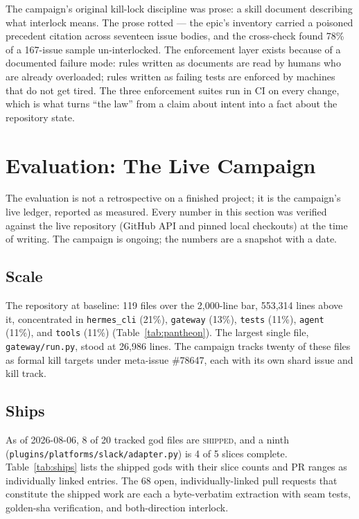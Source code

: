 \documentclass[11pt]{article}
\theoremstyle{definition}
\theoremstyle{plain}
\theoremstyle{remark}
\begin{document}
The campaign's original kill-lock discipline was prose: a skill document
describing what interlock means. The prose rotted --- the epic's inventory
carried a poisoned precedent citation across seventeen issue bodies, and the
cross-check found 78\% of a 167-issue sample un-interlocked. The enforcement
layer exists because of a documented failure mode: rules written as documents
are read by humans who are already overloaded; rules written as failing tests
are enforced by machines that do not get tired. The three enforcement suites
run in CI on every change, which is what turns ``the law'' from a claim about
intent into a fact about the repository state.

\section{Evaluation: The Live Campaign}
\label{sec:kag-eval}

The evaluation is not a retrospective on a finished project; it is the
campaign's live ledger, reported as measured. Every number in this section
was verified against the live repository (GitHub API and pinned local
checkouts) at the time of writing. The campaign is ongoing; the numbers are a
snapshot with a date.

\subsection{Scale}

The repository at baseline: 119 files over the 2{,}000-line bar, 553{,}314
lines above it, concentrated in \texttt{hermes\_cli} (21\%), \texttt{gateway}
(13\%), \texttt{tests} (11\%), \texttt{agent} (11\%), and \texttt{tools}
(11\%) (Table~\ref{tab:pantheon}). The largest single file,
\texttt{gateway/run.py}, stood at 26{,}986 lines. The campaign tracks twenty
of these files as formal kill targets under meta-issue \#78647, each with its
own shard issue and kill track.

\subsection{Ships}

As of 2026-08-06, 8 of 20 tracked god files are \textsc{shipped}, and a
ninth (\texttt{plugins/platforms/slack/adapter.py}) is 4 of 5 slices
complete. Table~\ref{tab:ships} lists the shipped gods with their slice
counts and PR ranges as individually linked entries. The 68 open,
individually-linked pull requests that constitute the shipped work are each a
byte-verbatim extraction with seam tests, golden-sha verification, and
both-direction interlock.
\end{document}
